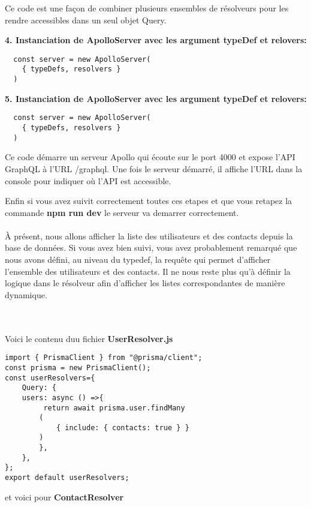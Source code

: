\documentclass{article}
\begin{document}
\begin{tcolorbox}
Ce code est une façon de combiner plusieurs ensembles de résolveurs pour les rendre accessibles dans un seul objet Query.

\textbf{4. Instanciation de  ApolloServer avec les argument typeDef et relovers:}

\begin{lstlisting}
  const server = new ApolloServer(
    { typeDefs, resolvers }
  )
\end{lstlisting}

\textbf{5. Instanciation de  ApolloServer avec les argument typeDef et relovers:}

\begin{lstlisting}
  const server = new ApolloServer(
    { typeDefs, resolvers }
  )
\end{lstlisting}

Ce code démarre un serveur Apollo qui écoute sur le port 4000 et expose l'API GraphQL à l'URL /graphql. Une fois le serveur démarré, il affiche l'URL dans la console pour indiquer où l'API est accessible.

\end{tcolorbox}
Enfin si vous avez suivit correctement toutes ces etapes et que vous retapez la commande \textbf{npm run dev} le serveur va demarrer correctement.\\\\

À présent, nous allons afficher la liste des utilisateurs et des contacts depuis la base de données. Si vous avez bien suivi, vous avez probablement remarqué que nous avons défini, au niveau du typedef, la requête qui permet d'afficher l'ensemble des utilisateurs et des contacts. Il ne nous reste plus qu'à définir la logique dans le résolveur afin d'afficher les listes correspondantes de manière dynamique.

\\\\
Voici le contenu duu fichier \textbf{UserResolver.js}

\begin{lstlisting}import { PrismaClient } from "@prisma/client";
const prisma = new PrismaClient();
const userResolvers={
    Query: {
    users: async () =>{
         return await prisma.user.findMany
        (
            { include: { contacts: true } }
        )
        },
    },
};
export default userResolvers;
\end{lstlisting}

et voici pour \textbf{ContactResolver}
\end{document}
